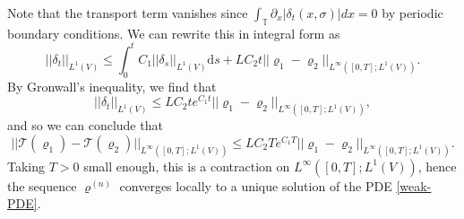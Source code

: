 \documentclass[11pt]{article}
\numberwithin{equation}{section}
\theoremstyle{definition}
\theoremstyle{plain}
\newcommand{\dd}{\mathrm{d}}
\begin{document}
Note that the transport term vanishes since $\int_{\mathbb{T}}\partial_x|\delta_t(x,\sigma)|dx =0$ by periodic boundary conditions. We can rewrite this in integral form as
\begin{equation}
    ||\delta_t||_{L^1(V)}  \leq \int_0^t C_1 ||\delta_s||_{L^1(V)}\dd s + LC_2t||\varrho_{1} - \varrho_{2}||_{L^\infty([0,T];L^1(V))}.
\end{equation}
By Gronwall's inequality, we find that 
\begin{equation}
    ||\delta_t||_{L^1(V)} \leq LC_2te^{ C_1t}||\varrho_{1} - \varrho_{2}||_{L^\infty([0,T];L^1(V))},
\end{equation}
and so we can conclude that 
\begin{equation}
    ||\mathcal{T}(\varrho_1) - \mathcal{T}(\varrho_2)||_{L^\infty([0,T];L^1(V))} \leq LC_2Te^{ C_1T}||\varrho_{1} - \varrho_{2}||_{L^\infty([0,T];L^1(V))} .
\end{equation}
Taking $T>0$ small enough, this is a contraction on $L^\infty([0,T];L^1(V))$, hence the sequence $\varrho^{(n)}$ converges locally to a unique solution of the PDE \eqref{weak-PDE}.
\end{document}
